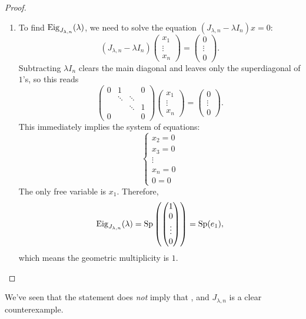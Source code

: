 \begin{proof}
\begin{enumerate}[label=\textbf{(\alph*)}]
    \item To find $\operatorname{Eig}_{J_{\lambda, n}}(\lambda)$, we need to solve the equation $(J_{\lambda, n} - \lambda I_n)x = 0$:
    \[
    (J_{\lambda, n} - \lambda I_n) \begin{pmatrix} x_1 \\ \vdots \\ x_n \end{pmatrix} = \begin{pmatrix} 0 \\ \vdots \\ 0 \end{pmatrix}.
    \]
    Subtracting $\lambda I_n$ clears the main diagonal and leaves only the superdiagonal of $1$'s, so this reads
    \[
    \begin{pmatrix} 0 & 1 & & 0 \\ & \ddots & \ddots & \\ & & \ddots & 1 \\ 0 & & & 0 \end{pmatrix} \begin{pmatrix} x_1 \\ \vdots \\ x_n \end{pmatrix} = \begin{pmatrix} 0 \\ \vdots \\ 0 \end{pmatrix}.
    \]
    This immediately implies the system of equations:
    \[
    \begin{cases}
    x_2 = 0 \\
    x_3 = 0 \\
    \vdots \\
    x_n = 0 \\
    0 = 0
    \end{cases}
    \]
    The only free variable is $x_1$. Therefore,
    \[
    \operatorname{Eig}_{J_{\lambda, n}}(\lambda) = \operatorname{Sp}\left( \begin{pmatrix} 1 \\ 0 \\ \vdots \\ 0 \end{pmatrix} \right) = \operatorname{Sp}(e_1),
    \]
    which means the geometric multiplicity is $1$.
\end{enumerate}
\end{proof}

We've seen that the statement  does \emph{not} imply that , and $J_{\lambda, n}$ is a clear counterexample.

